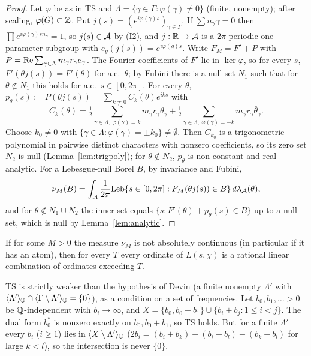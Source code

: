 \begin{proof}
Let $\varphi$ be as in TS and $\Lambda=\{\gamma\in\Gamma:\varphi(\gamma)\ne0\}$ (finite, nonempty); after scaling, $\varphi(G)\subset\mathbb Z$. Put $j(s)=(e^{i\varphi(\gamma)s})_{\gamma\in\Gamma}$. If $\sum n_\gamma\gamma=0$ then $\prod e^{i\varphi(\gamma)sn_\gamma}=1$, so $j(s)\in\mathcal A$ by (I2), and $j:\mathbb R\to\mathcal A$ is a $2\pi$-periodic one-parameter subgroup with $e_g(j(s))=e^{i\varphi(g)s}$. Write $F_M=F'+P$ with $P=\operatorname{Re}\sum_{\gamma\in\Lambda}m_\gamma r_\gamma e_\gamma$. The Fourier coefficients of $F'$ lie in $\ker\varphi$, so for every $s$, $F'(\theta j(s))=F'(\theta)$ for a.e.\ $\theta$; by Fubini there is a null set $N_1$ such that for $\theta\notin N_1$ this holds for a.e.\ $s\in[0,2\pi]$. For every $\theta$, $p_\theta(s):=P(\theta j(s))=\sum_{k\ne0}C_k(\theta)e^{iks}$ with
\[
C_k(\theta)=\tfrac12\sum_{\gamma\in\Lambda,\ \varphi(\gamma)=k}m_\gamma r_\gamma\theta_\gamma+\tfrac12\sum_{\gamma\in\Lambda,\ \varphi(\gamma)=-k}m_\gamma\bar r_\gamma\bar\theta_\gamma .
\]
Choose $k_0\ne0$ with $\{\gamma\in\Lambda:\varphi(\gamma)=\pm k_0\}\ne\emptyset$. Then $C_{k_0}$ is a trigonometric polynomial in pairwise distinct characters with nonzero coefficients, so its zero set $N_2$ is null (Lemma~\ref{lem:trigpoly}); for $\theta\notin N_2$, $p_\theta$ is non-constant and real-analytic. For a Lebesgue-null Borel $B$, by invariance and Fubini,
\[
\nu_M(B)=\int_\mathcal A\frac1{2\pi}\mathrm{Leb}\{s\in[0,2\pi]:F_M(\theta j(s))\in B\}\,d\lambda_{\mathcal A}(\theta),
\]
and for $\theta\notin N_1\cup N_2$ the inner set equals $\{s:F'(\theta)+p_\theta(s)\in B\}$ up to a null set, which is null by Lemma~\ref{lem:analytic}.
\end{proof}

\begin{corollary}\label{cor:TSatom}
If for some $M>0$ the measure $\nu_M$ is not absolutely continuous (in particular if it has an atom), then for every $T$ every ordinate of $L(s,\chi)$ is a rational linear combination of ordinates exceeding $T$.
\end{corollary}

\begin{example}[\rd{1 read}]\label{ex:TSweaker}
TS is strictly weaker than the hypothesis of Devin \cite[Theorem~2.2]{Devin} (a finite nonempty $\Lambda'$ with $\langle\Lambda'\rangle_{\mathbb Q}\cap\langle\Gamma\setminus\Lambda'\rangle_{\mathbb Q}=\{0\}$), as a condition on a set of frequencies. Let $b_0,b_1,\ldots>0$ be $\mathbb Q$-independent with $b_i\to\infty$, and $X=\{b_0,b_0+b_1\}\cup\{b_i+b_j:1\le i<j\}$. The dual form $b_0^*$ is nonzero exactly on $b_0,b_0+b_1$, so TS holds. But for a finite $\Lambda'$ every $b_i$ ($i\ge1$) lies in $\langle X\setminus\Lambda'\rangle_{\mathbb Q}$ ($2b_i=(b_i+b_k)+(b_i+b_l)-(b_k+b_l)$ for large $k<l$), so the intersection is never $\{0\}$.
\end{example}

